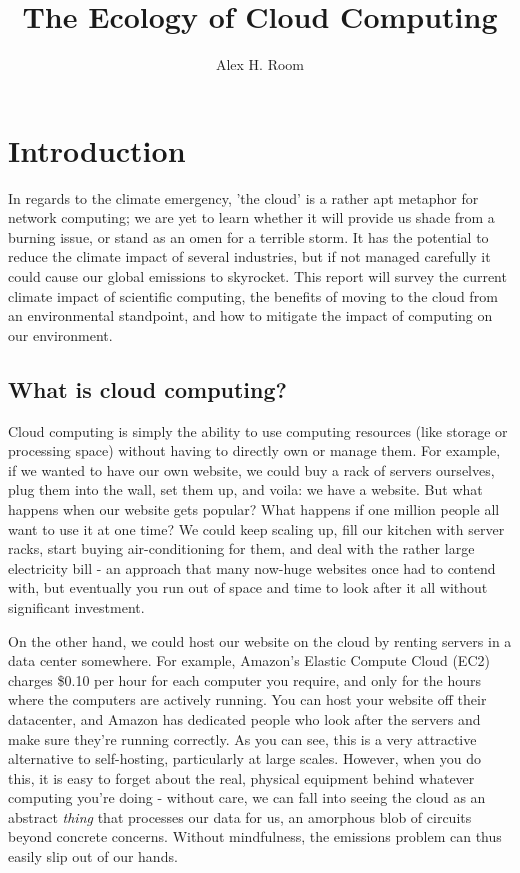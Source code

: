\documentclass{article}
\title{The Ecology of Cloud Computing}
\author{Alex H. Room}
\begin{document}
\maketitle



\section{Introduction}

In regards to the climate emergency, 'the cloud' is a rather apt metaphor for network computing; we are yet to learn whether it will provide us shade from a burning issue, or stand as an omen for a terrible storm. It has the potential to reduce the climate impact of several industries, but if not managed carefully it could cause our global emissions to skyrocket. This report will survey the current climate impact of scientific computing, the benefits of moving to the cloud from an environmental standpoint, and how to mitigate the impact of computing on our environment.


\subsection{What is cloud computing?}
Cloud computing is simply the ability to use computing resources (like storage or processing space) without having to directly own or manage them. For example, if we wanted to have our own website, we could buy a rack of servers ourselves, plug them into the wall, set them up, and voila: we have a website. But what happens when our website gets popular? What happens if one million people all want to use it at one time? We could keep scaling up, fill our kitchen with server racks, start buying air-conditioning for them, and deal with the rather large electricity bill - an approach that many now-huge websites once had to contend with, but eventually you run out of space and time to look after it all without significant investment. \newline

On the other hand, we could host our website on the cloud by renting servers in a data center somewhere. For example, Amazon's Elastic Compute Cloud (EC2) charges \$0.10 per hour for each computer you require, and only for the hours where the computers are actively running. You can host your website off their datacenter, and Amazon has dedicated people who look after the servers and make sure they're running correctly. As you can see, this is a very attractive alternative to self-hosting, particularly at large scales. However, when you do this, it is easy to forget about the real, physical equipment behind whatever computing you're doing - without care, we can fall into seeing the cloud as an abstract \emph{thing} that processes our data for us, an amorphous blob of circuits beyond concrete concerns. Without mindfulness, the emissions problem can thus easily slip out of our hands. 
\end{document}
